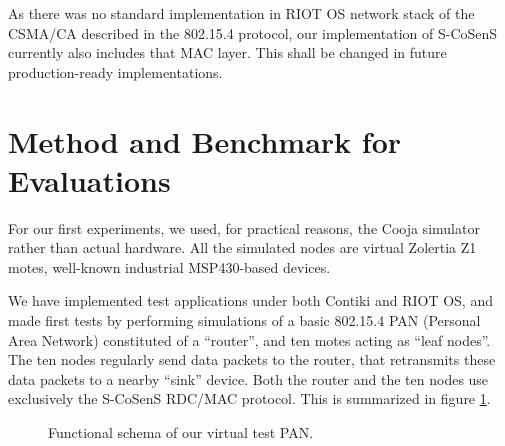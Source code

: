 \documentclass[conference]{IEEEtran}
\begin{document}
As there was no standard implementation in RIOT OS network stack of
the CSMA/CA described in the 802.15.4 protocol, our implementation of
S-CoSenS currently also includes that MAC layer. This shall be changed
in future production-ready implementations.



\section{Method and Benchmark for Evaluations}

For our first experiments, we used, for practical reasons, the Cooja
simulator rather than actual hardware. All the simulated nodes are
virtual Zolertia Z1 motes, well-known industrial MSP430-based devices.

We have implemented test applications under both Contiki and RIOT OS, and
made first tests by performing simulations of a basic 802.15.4 PAN
(Personal Area Network) constituted of a ``router'', and ten motes
acting as ``leaf nodes''. The ten nodes regularly send data packets to
the router, that retransmits these data packets to a nearby ``sink'' device.
Both the router and the ten nodes use exclusively the S-CoSenS RDC/MAC
protocol. This is summarized in figure \ref{FigPANtest}.

\begin{figure}[!h]
\centering
{}
\caption{Functional schema of our virtual test PAN.}
\label{FigPANtest}
\end{figure}
\end{document}

